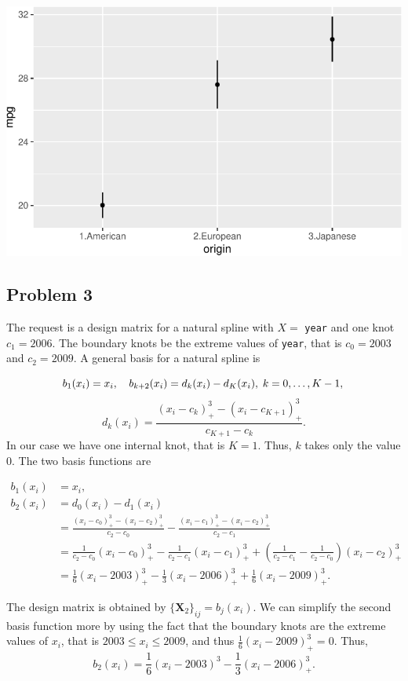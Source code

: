 \documentclass[
]{article}
\begin{document}
\includegraphics{RecEx7-sol_files/figure-latex/unnamed-chunk-3-1.pdf}

\hypertarget{problem-3}{%
\subsection{Problem 3}\label{problem-3}}

The request is a design matrix for a natural spline with \(X =\)
\texttt{year} and one knot \(c_1 = 2006\). The boundary knots be the
extreme values of \texttt{year}, that is \(c_0 = 2003\) and
\(c_2 = 2009\). A general basis for a natural spline is

\[
b_1(x_i) = x_i, \quad b_{k+2}(x_i) = d_k(x_i)-d_K(x_i),\; k = 0, \ldots, K - 1,\\
\] \[
d_k(x_i) = \frac{(x_i-c_k)^3_+-(x_i-c_{K+1})^3_+}{c_{K+1}-c_k}.
\] In our case we have one internal knot, that is \(K=1\). Thus, \(k\)
takes only the value 0. The two basis functions are

\begin{align*}
b_1(x_i) &= x_i,\\
b_2(x_i) &= d_0(x_i)-d_1(x_i)\\
&= \frac{(x_i-c_0)^3_+-(x_i-c_2)^3_+}{c_2-c_0} - \frac{(x_i-c_1)^3_+-(x_i-c_2)^3_+}{c_2-c_1}\\
&= \frac{1}{c_2-c_0}(x_i-c_0)^3_+ - \frac{1}{c_2-c_1}(x_i-c_1)^3_+ + \left(\frac{1}{c_2-c_1}-\frac{1}{c_2-c_0}\right)(x_i-c_{2})^3_+\\
&= \frac{1}{6}(x_i-2003)^3_+ - \frac{1}{3}(x_i-2006)^3_+ + \frac{1}{6}(x_i-2009)^3_+.
\end{align*}

The design matrix is obtained by \(\{\mathbf X_2\}_{ij} = b_j(x_i)\). We
can simplify the second basis function more by using the fact that the
boundary knots are the extreme values of \(x_i\), that is
\(2003 \leq x_i \leq 2009\), and thus \(\frac{1}{6}(x_i-2009)^3_+=0\).
Thus, \[
b_2(x_i) = \frac{1}{6}(x_i-2003)^3 - \frac{1}{3}(x_i-2006)^3_+.
\]
\end{document}
